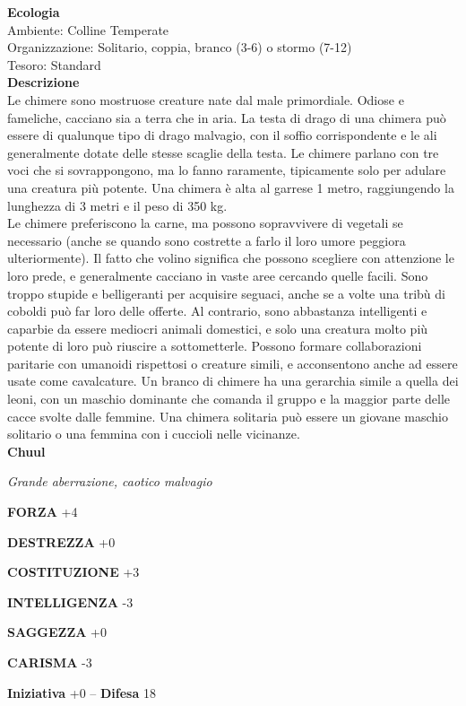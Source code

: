 \begin{multicols}{2}
\textbf{Ecologia}\\
Ambiente: Colline Temperate\\
Organizzazione: Solitario, coppia, branco (3-6) o stormo (7-12)\\
Tesoro: Standard\\
\textbf{Descrizione}\\
Le chimere sono mostruose creature nate dal male primordiale. Odiose e fameliche, cacciano sia a terra che in aria. La testa di drago di una chimera può essere di qualunque tipo di drago malvagio, con il soffio corrispondente e le ali generalmente dotate delle stesse scaglie della testa. Le chimere parlano con tre voci che si sovrappongono, ma lo fanno raramente, tipicamente solo per adulare una creatura più potente. Una chimera è alta al garrese 1 metro, raggiungendo la lunghezza di 3 metri e il peso di 350 kg.\\
Le chimere preferiscono la carne, ma possono sopravvivere di vegetali se necessario (anche se quando sono costrette a farlo il loro umore peggiora ulteriormente). Il fatto che volino significa che possono scegliere con attenzione le loro prede, e generalmente cacciano in vaste aree cercando quelle facili. Sono troppo stupide e belligeranti per acquisire seguaci, anche se a volte una tribù di coboldi può far loro delle offerte. Al contrario, sono abbastanza intelligenti e caparbie da essere mediocri animali domestici, e solo una creatura molto più potente di loro può riuscire a sottometterle. Possono formare collaborazioni paritarie con umanoidi rispettosi o creature simili, e acconsentono anche ad essere usate come cavalcature. Un branco di chimere ha una gerarchia simile a quella dei leoni, con un maschio dominante che comanda il gruppo e la maggior parte delle cacce svolte dalle femmine. Una chimera solitaria può essere un giovane maschio solitario o una femmina con i cuccioli nelle vicinanze.\\


\medskip{}\textbf{Chuul}

\emph{Grande aberrazione, caotico malvagio}

\textbf{FORZA} +4

\textbf{DESTREZZA} +0

\textbf{COSTITUZIONE} +3

\textbf{INTELLIGENZA} -3

\textbf{SAGGEZZA} +0

\textbf{CARISMA} -3

\textbf{Iniziativa} +0 -- \textbf{Difesa} 18


\end{multicols}
